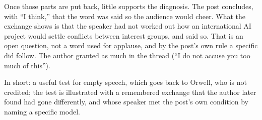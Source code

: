 \begin{afterword}
Once those parts are put back, little supports the diagnosis. The post concludes, with ``I think,'' that the word was said so the audience would cheer. What the exchange shows is that the speaker had not worked out how an international AI project would settle conflicts between interest groups, and said so. That is an open question, not a word used for applause, and by the post's own rule a specific did follow. The author granted as much in the thread (``I do not accuse you too much of this'').

In short: a useful test for empty speech, which goes back to Orwell, who is not credited; the test is illustrated with a remembered exchange that the author later found had gone differently, and whose speaker met the post's own condition by naming a specific model.
\end{afterword}
